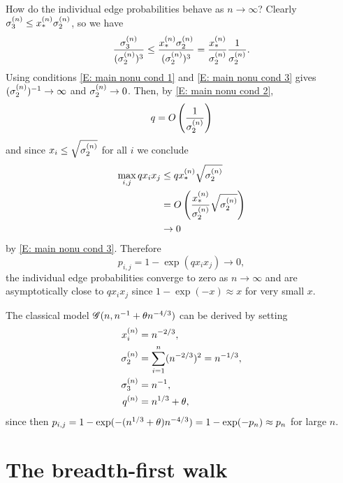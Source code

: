 How do the individual edge probabilities behave as $n \rightarrow \infty$?
Clearly $\sigma^{(n)}_3 \leq x_*^{(n)} \sigma^{(n)}_2$, so we have
\begin{equation}
	\frac{\sigma^{(n)}_3}{(\sigma^{(n)}_2)^3} \leq \frac{x_*^{(n)} \sigma^{(n)}_2}{(\sigma^{(n)}_2)^3} = \frac{x_*^{(n)}}{\sigma^{(n)}_2}\frac{1}{\sigma^{(n)}_2}.
\end{equation}
Using conditions \eqref{E: main nonu cond 1} and \eqref{E: main nonu cond 3} gives
$(\sigma^{(n)}_2)^{-1} \rightarrow \infty$ and $\sigma^{(n)}_2 \rightarrow 0$.
Then, by \eqref{E: main nonu cond 2},
\begin{equation}
	q = O\left(\frac{1}{\sigma^{(n)}_2}\right)
\end{equation}
and since $x_i \leq \sqrt{\sigma^{(n)}_2}$ for all $i$ we conclude
\begin{equation}
	\begin{aligned}
	\max_{i,j} q x_i x_j 
	&\leq q x_*^{(n)} \sqrt{\sigma^{(n)}_2} \\
	&= O\left( \frac{x_*^{(n)}}{\sigma^{(n)}_2} \sqrt{\sigma^{(n)}_2} \right) \\
	&\rightarrow 0
	\end{aligned}
\end{equation}
by \eqref{E: main nonu cond 3}.
Therefore
\begin{equation}
	p_{i,j} = 1 - \exp(q x_i x_j) \rightarrow 0,
\end{equation}
the individual edge probabilities converge to zero as $n \rightarrow \infty$
and are asymptotically close to $qx_i x_j$ since $1 - \exp(-x) \approx x$ for very small $x$.

The classical model $\mathscr{G}(n, n^{-1} + \theta n^{-4/3})$ can be derived by setting
\begin{equation}
\begin{aligned}
	x_i^{(n)} &= n^{-2 / 3},  \\
	\sigma^{(n)}_2 &= \sum_{i = 1}^{n} (n^{-2 / 3})^2 = n^{-1 / 3}, \\
	\sigma^{(n)}_3 &= n^{-1}, \\
	q^{(n)} &= n^{1 / 3} + \theta,
\end{aligned}
\end{equation}
since then $p_{i,j} = 1 - \exp(-(n^{1 / 3} + \theta)n^{-4 / 3}) = 1 - \exp(-p_n) \approx p_n$ for large $n$.


\section{The breadth-first walk}

